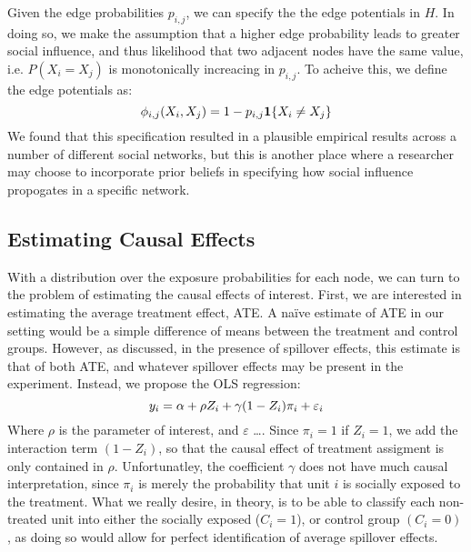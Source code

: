 \documentclass{article}
\begin{document}
Given the edge probabilities $p_{i,j}$, we can specify the the edge potentials in $H$. In doing so, 
we make the assumption that a higher edge probability leads to greater social influence, and thus likelihood that two adjacent nodes 
have the same value, i.e. $P(X_i = X_j)$ is monotonically increacing in $p_{i,j}$. To acheive this, we define the edge potentials as:
\begin{displaymath}
  \phi_{i,j}(X_i, X_j) = 1 - p_{i,j}\mathbf{1}\{{X_i \neq X_j}\} \\[0.5ex]
\end{displaymath}
We found that this specification resulted in a plausible empirical results across a number of different social networks, but this is another place where a researcher may choose to 
incorporate prior beliefs in specifying how social influence propogates in a specific network.

\subsection{Estimating Causal Effects}

With a distribution over the exposure probabilities for each node, we can turn to the problem of estimating the causal effects of interest. 
First, we are interested in estimating the average treatment effect, ATE. A naïve estimate of ATE in our setting would be a simple difference of means 
between the treatment and control groups. However, as discussed, in the presence of spillover effects, this estimate is that of both ATE, and whatever spillover 
effects may be present in the experiment. Instead, we propose the OLS regression: 
\begin{equation}
  y_i = \alpha + \rho Z_i + \gamma (1 - Z_i) \pi_i + \varepsilon_i \\[1.0ex]
\end{equation}
Where $\rho$ is the parameter of interest, and $\varepsilon$ \dots . Since $\pi_i = 1$ if $Z_i = 1$, we add the interaction term $(1 - Z_i)$, so that the causal effect of
treatment assigment is only contained in $\rho$. Unfortunatley, the coefficient $\gamma$ does not have much causal interpretation, since $\pi_i$ is merely the probability that unit $i$
is socially exposed to the treatment. What we really desire, in theory, is to be able to classify each non-treated unit into either the socially exposed ($C_i = 1$), or control group $(C_i = 0)$, as doing so 
would allow for perfect identification of average spillover effects. 
\end{document}

